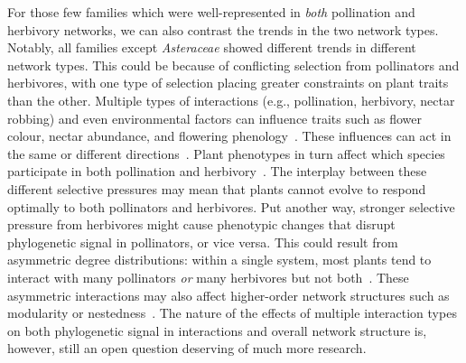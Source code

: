 \documentclass[12pt]{article}
\begin{document}
\begin{spacing}{1.5}
    For those few families which were well-represented in \emph{both} pollination
  and herbivory networks, we can also contrast the 
  trends in the two network types. Notably, all families except \emph{Asteraceae} 
  showed different trends in different network types. 
  This could be because of conflicting selection from pollinators and herbivores,
  with one type of selection placing greater constraints on plant traits than the other.
  Multiple types of interactions (e.g., pollination, herbivory, nectar robbing) 
  and even environmental factors can influence traits such as 
  flower colour, nectar abundance, and flowering phenology~\citep{Strauss2006}. 
  These influences can act in the same or different directions~\citep{Strauss2006}.
  Plant phenotypes in turn affect which species participate in both pollination and herbivory~\citep{Strauss1997,Strauss2002,Adler2004,Adler2006,Theis2006}.
  The interplay between these different selective pressures may mean that plants
  cannot evolve to respond optimally to both pollinators and herbivores. Put another
  way, stronger selective pressure from herbivores might cause phenotypic changes
  that disrupt phylogenetic signal in pollinators, or vice versa. This could result from
  asymmetric degree distributions: within a single system, most plants tend to interact
  with many pollinators \emph{or} many herbivores but not both~\citep{Melian2009,Pocock2012,Astegiano2017}.
  These asymmetric interactions may also affect higher-order network structures such as
  modularity or nestedness~\citep{Astegiano2017}. The nature of the effects of multiple interaction types on both phylogenetic signal in interactions and overall network structure is, however, still an open question deserving of much more research.



\end{spacing}
\end{document}
